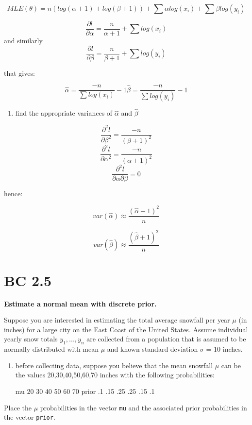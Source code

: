 \documentclass[11pt]{article}
\providecommand{\tightlist}{%
      \setlength{\itemsep}{0pt}\setlength{\parskip}{0pt}}
\begin{document}
    \[MLE(\theta) = n (log(\alpha+1) + log(\beta+1)) + \sum{\alpha log(x_i)} + \sum{\beta log(y_i)}\]

\[ \frac{\partial l}{\partial \alpha} = \frac{n}{\alpha+1} + \sum{log(x_i)}\]
and similarly
\[ \frac{\partial l}{\partial \beta} = \frac{n}{\beta+1} + \sum{log(y_i)}\]

that gives:

\[\hat\alpha = \frac{-n}{\sum log(x_i)}-1 \hat\beta = \frac{-n}{\sum log(y_i)}-1 \]

    \begin{enumerate}
\def\labelenumi{\alph{enumi})}
\setcounter{enumi}{2}
\tightlist
\item
  find the appropriate variances of \(\hat\alpha\) and \(\hat\beta\)
\end{enumerate}

    \[\frac{\partial^2l}{\partial\beta^2}=\frac{-n}{(\beta+1)^2}\]
\[\frac{\partial^2l}{\partial\alpha^2}=\frac{-n}{(\alpha+1)^2}\]
\[\frac{\partial^2l}{\partial\alpha\partial\beta}=0\]

hence:

\[var(\hat\alpha)\approx\frac{(\hat\alpha+1)^2}{n}\]

\[var(\hat\beta)\approx\frac{(\hat\beta+1)^2}{n}\]

    \hypertarget{bc-2.5}{%
\section{BC 2.5}\label{bc-2.5}}

\textbf{Estimate a normal mean with discrete prior.}

Suppose you are interested in estimating the total average snowfall per
year \(\mu\) (in inches) for a large city on the East Coast of the
United States. Assume individual yearly snow totals \(y_1, ... , y_n\)
are collected from a population that is assumed to be normally
distributed with mean \(\mu\) and known standard deviation \(\sigma\) =
10 inches.

\begin{enumerate}
\def\labelenumi{\alph{enumi})}
\item
  before collecting data, suppose you believe that the mean snowfall
  \(\mu\) can be the values 20,30,40,50,60,70 inches with the following
  probabilities:

  mu \textbar{} 20 30 40 50 60 70 prior \textbar{} .1 .15 .25 .25 .15 .1
\end{enumerate}

Place the \(\mu\) probabilities in the vector \texttt{mu} and the
associated prior probabilities in the vector \texttt{prior}.
\end{document}
